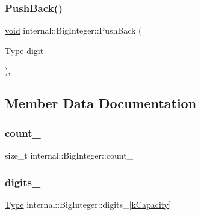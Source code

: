 \mbox{\label{classinternal_1_1BigInteger_a18a4939a983f296085fed6bc5b56d5c1}} 
\subsubsection{\texorpdfstring{Push\+Back()}{PushBack()}}
{\footnotesize\ttfamily \hyperlink{imgui__impl__opengl3__loader_8h_ac668e7cffd9e2e9cfee428b9b2f34fa7}{void} internal\+::\+Big\+Integer\+::\+Push\+Back (\begin{DoxyParamCaption}\item[{\hyperlink{classinternal_1_1BigInteger_a1310812fca26ebae77594ba08678fc4c}{Type}}]{digit }\end{DoxyParamCaption})\hspace{0.3cm}{\ttfamily [inline]}, {\ttfamily [private]}}



\subsection{Member Data Documentation}
\mbox{\label{classinternal_1_1BigInteger_ad4bf5198afe86d754ec57a82605e644b}} 
\subsubsection{\texorpdfstring{count\+\_\+}{count\_}}
{\footnotesize\ttfamily size\+\_\+t internal\+::\+Big\+Integer\+::count\+\_\+\hspace{0.3cm}{\ttfamily [private]}}

\mbox{\label{classinternal_1_1BigInteger_a0b505df38fedd862a748fe1e629d918a}} 
\subsubsection{\texorpdfstring{digits\+\_\+}{digits\_}}
{\footnotesize\ttfamily \hyperlink{classinternal_1_1BigInteger_a1310812fca26ebae77594ba08678fc4c}{Type} internal\+::\+Big\+Integer\+::digits\+\_\+\mbox{[}\hyperlink{classinternal_1_1BigInteger_a8a908718d685b9bd39fb52f2e511b0c6}{k\+Capacity}\mbox{]}\hspace{0.3cm}{\ttfamily [private]}}

